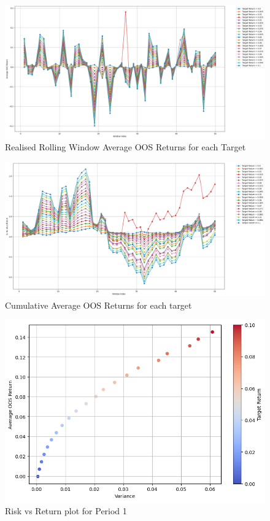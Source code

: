 \documentclass[12pt,twoside]{article}
\begin{document}
\begin{figure}[htbp!]
    \centering
    \includegraphics[width = 1.0\hsize]{./figures/mean_returns_plot.png} %
    \caption{Realised Rolling Window Average OOS Returns for each Target} 
    \label{fig:OOS_rets}
\end{figure}

\begin{figure}[]
    \centering
    \includegraphics[width = 1.0\hsize]{./figures/mean_cum_returns_plot.png}
    \caption{Cumulative Average OOS Returns for each target}
    \label{fig:OOS_cum_rets}
\end{figure}

\begin{figure}[]
    \centering
    \includegraphics[width = 1.0\hsize]{./figures/mean_returns_vs_variance.png}
    \caption{Risk vs Return plot for Period 1}
    \label{fig:Returns_vs_Risk}
\end{figure}
\end{document}
